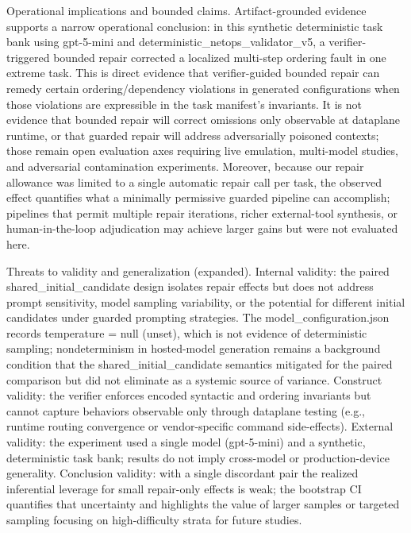 \documentclass[conference]{IEEEtran}
\begin{document}
Operational implications and bounded claims. Artifact-grounded evidence supports a narrow operational conclusion: in this synthetic deterministic task bank using gpt-5-mini and deterministic\_netops\_validator\_v5, a verifier-triggered bounded repair corrected a localized multi-step ordering fault in one extreme task. This is direct evidence that verifier-guided bounded repair can remedy certain ordering/dependency violations in generated configurations when those violations are expressible in the task manifest's invariants. It is not evidence that bounded repair will correct omissions only observable at dataplane runtime, or that guarded repair will address adversarially poisoned contexts; those remain open evaluation axes requiring live emulation, multi-model studies, and adversarial contamination experiments. Moreover, because our repair allowance was limited to a single automatic repair call per task, the observed effect quantifies what a minimally permissive guarded pipeline can accomplish; pipelines that permit multiple repair iterations, richer external-tool synthesis, or human-in-the-loop adjudication may achieve larger gains but were not evaluated here.

Threats to validity and generalization (expanded). Internal validity: the paired shared\_initial\_candidate design isolates repair effects but does not address prompt sensitivity, model sampling variability, or the potential for different initial candidates under guarded prompting strategies. The model\_configuration.json records temperature = null (unset), which is not evidence of deterministic sampling; nondeterminism in hosted-model generation remains a background condition that the shared\_initial\_candidate semantics mitigated for the paired comparison but did not eliminate as a systemic source of variance. Construct validity: the verifier enforces encoded syntactic and ordering invariants but cannot capture behaviors observable only through dataplane testing (e.g., runtime routing convergence or vendor-specific command side-effects). External validity: the experiment used a single model (gpt-5-mini) and a synthetic, deterministic task bank; results do not imply cross-model or production-device generality. Conclusion validity: with a single discordant pair the realized inferential leverage for small repair-only effects is weak; the bootstrap CI quantifies that uncertainty and highlights the value of larger samples or targeted sampling focusing on high-difficulty strata for future studies.
\end{document}
